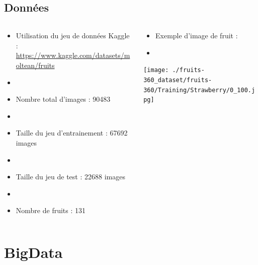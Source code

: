 \documentclass[8pt,aspectratio=169,hyperref={unicode=true}]{beamer}
\begin{document}
\subsection{Données}
\begin{frame}{\insertsubsection}
  \begin{columns}
    \begin{column}{.6\textwidth}
      \begin{itemize}
        \item Utilisation du jeu de données Kaggle : \url{https://www.kaggle.com/datasets/moltean/fruits}
        \item[]
        \item Nombre total d'images : 90483
        \item[]
        \item Taille du jeu d'entrainement : 67692 images
        \item[]
        \item Taille du jeu de test : 22688 images
        \item[]
        \item  Nombre de fruits : 131
      \end{itemize}
    \end{column}
    \begin{column}{.4\textwidth}
      \begin{itemize}
        \item Exemple d'image de fruit :
        \item[]
      \end{itemize}
      \center
      \texttt{[image: ./fruits-360\_dataset/fruits-360/Training/Strawberry/0\_100.jpg]}
    \end{column}
  \end{columns}
\end{frame}

\section{BigData}
\end{document}
